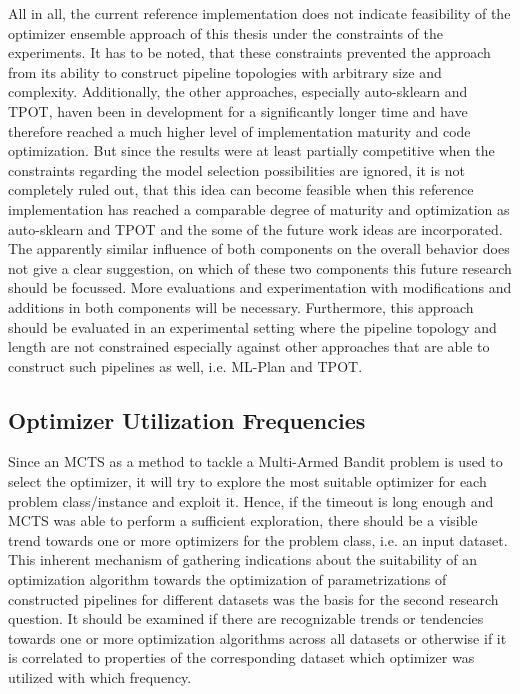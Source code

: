 All in all, the current reference implementation does not indicate feasibility of the optimizer ensemble approach of this thesis under the constraints of the experiments.
It has to be noted, that these constraints prevented the approach from its ability to construct pipeline topologies with arbitrary size and complexity.
Additionally, the other approaches, especially auto-sklearn and TPOT, haven been in development for a significantly longer time and have therefore reached a much higher level of implementation maturity and code optimization.\newline
But since the results were at least partially competitive when the constraints regarding the model selection possibilities are ignored, it is not completely ruled out, that this idea can become feasible when this reference implementation has reached a comparable degree of maturity and optimization as auto-sklearn and TPOT and the some of the future work ideas are incorporated.\newline
The apparently similar influence of both components on the overall behavior does not give a clear suggestion, on which of these two components this future research should be focussed.
More evaluations and experimentation with modifications and additions in both components will be necessary.
Furthermore, this approach should be evaluated in an experimental setting where the pipeline topology and length are not constrained especially against other approaches that are able to construct such pipelines as well, i.e. ML-Plan and TPOT.

\subsection{Optimizer Utilization Frequencies}
\label{sec:evaluation:analysis:optimizer}
Since an MCTS as a method to tackle a Multi-Armed Bandit problem is used to select the optimizer, it will try to explore the most suitable optimizer for each problem class/instance and exploit it.
Hence, if the timeout is long enough and MCTS was able to perform a sufficient exploration, there should be a visible trend towards one or more optimizers for the problem class, i.e. an input dataset.\newline
This inherent mechanism of gathering indications about the suitability of an optimization algorithm towards the optimization of parametrizations of constructed pipelines for different datasets was the basis for the second research question.\newline
It should be examined if there are recognizable trends or tendencies towards one or more optimization algorithms across all datasets or otherwise if it is correlated to properties of the corresponding dataset which optimizer was utilized with which frequency.

